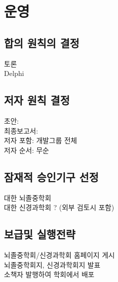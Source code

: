 \documentclass{paper}
\begin{document}
\vspace{30pt}
\section{운영}
\subsection{합의 원칙의 결정}
토론\\
Delphi 

\subsection{저자 원칙 결정}
초안: \\
최종보고서: \\
저자 포함: 개발그룹 전체\\
저자 순서: 무순

\subsection{잠재적 승인기구 선정}
대한 뇌졸중학회\\
대한 신경과학회 ? (외부 검토시 포함)

\subsection{보급및 실행전략}
뇌졸중학회/신경과학회 홈페이지 게시\\
뇌졸중학회지, 신경과학회지 발표\\
소책자 발행하여 학회에서 배포
\end{document}
